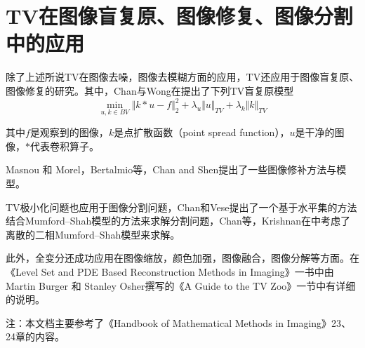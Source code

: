 \documentclass[a4paper,12pt]{article}
\begin{document}
\section{TV在图像盲复原、图像修复、图像分割中的应用}

除了上述所说TV在图像去噪，图像去模糊方面的应用，TV还应用于图像盲复原、图像修复的研究。其中，Chan与Wong在\cite{Chan:1998tv}提出了下列TV盲复原模型
\begin{displaymath}
\min_{u,k\in BV}\Vert k*u-f\Vert_2^2+\lambda_u\Vert u\Vert_{TV}+\lambda_k\Vert k\Vert_{TV}
\end{displaymath}

其中$f$是观察到的图像，$k$是点扩散函数（point spread function），$u$是干净的图像，$*$代表卷积算子。

Masnou 和 Morel\cite{Masnou:1998in}，Bertalmio等\cite{Bertalmi:2000in}，Chan and Shen\cite{Chan:2001in}提出了一些图像修补方法与模型。

TV极小化问题也应用于图像分割问题，Chan和Vese\cite{Chan:2001se}提出了一个基于水平集的方法结合Mumford–Shah模型的方法来求解分割问题，Chan等\cite{Chan:2006se}，Krishnan在\cite{Krishnan:2009se}中考虑了离散的二相Mumford–Shah模型来求解。

此外，全变分还成功应用在图像缩放，颜色加强，图像融合，图像分解等方面。在《Level Set and PDE Based Reconstruction Methods in Imaging》一书中由Martin Burger 和 Stanley Osher撰写的《A Guide to the TV Zoo》一节中有详细的说明\cite{Burger:2013tv}。
\newline

注：本文档主要参考了《Handbook of Mathematical Methods in Imaging》\cite{Scherzer:2011im}23、24章的内容。




\end{document}
